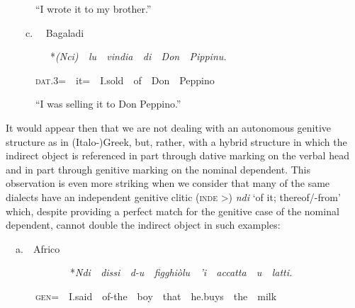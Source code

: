 \documentclass[output=paper,modfonts,nonflat]{langsci/langscibook}
\begin{document}
\begin{styleStandard}
\ \ \ \ \ \ “I wrote it to my brother.”
\end{styleStandard}

\begin{styleStandard}
\ \ \ \ c. \ \ Bagaladi
\end{styleStandard}

\begin{styleStandard}
\ \ \ \  \ \ \ \ \ *\textit{(Nci)\ \ lu\ \ vindia\ \ di\ \ Don\ \ Pippinu.}
\end{styleStandard}

\begin{styleStandard}
\ \ \ \ \ \ \textsc{dat}.3=\ \ it=\ \ I.sold\ \ of\ \ Don\ \ Peppino
\end{styleStandard}

\begin{styleStandard}
\ \ \ \ \ \ “I was selling it to Don Peppino.”
\end{styleStandard}

\begin{styleStandard}
It would appear then that we are not dealing with an autonomous genitive structure as in (Italo\nobreakdash-)Greek, but, rather, with a hybrid structure in which the indirect object is referenced in part through dative marking on the verbal head and in part through genitive marking on the nominal dependent. This observation is even more striking when we consider that many of the same dialects have an independent genitive clitic (\textsc{inde} {\textgreater}) \textit{ndi }‘of it; thereof/-from’ which, despite providing a perfect match for the genitive case of the nominal dependent, cannot double the indirect object in such examples:
\end{styleStandard}

\begin{listWWNumviiileveli}
\item 
\begin{styleListParagraph}
\ \ a.\ \ Africo
\end{styleListParagraph}
\end{listWWNumviiileveli}
\begin{styleListParagraph}
\ \ \ \ \ \ \ \ \ \ \ \ \ *\textit{Ndi\ \ dissi\ \ d-u\ \ figghiòlu\ \ ’i\ \ accatta\ \ u\ \ latti.}
\end{styleListParagraph}

\begin{styleesempi}
\ \ \ \ \ \ \textsc{gen}=\ \ I.said\ \ of-the\ \ boy\ \ that\ \ he.buys\ \ the\ \ milk
\end{styleesempi}
\end{document}

